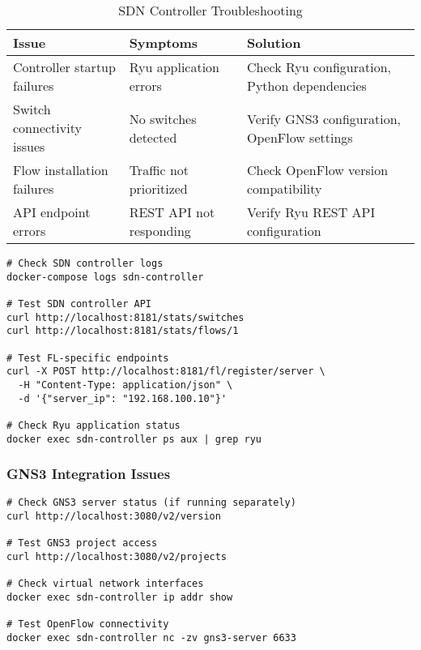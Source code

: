 \begin{table}[H]
\centering
\caption{SDN Controller Troubleshooting}
\label{tab:sdn-issues}
\begin{tabularx}{\textwidth}{@{}lXX@{}}
\toprule
\textbf{Issue} & \textbf{Symptoms} & \textbf{Solution} \\
\midrule
Controller startup failures & Ryu application errors & Check Ryu configuration, Python dependencies \\
Switch connectivity issues & No switches detected & Verify GNS3 configuration, OpenFlow settings \\
Flow installation failures & Traffic not prioritized & Check OpenFlow version compatibility \\
API endpoint errors & REST API not responding & Verify Ryu REST API configuration \\
\bottomrule
\end{tabularx}
\end{table}

\begin{lstlisting}[style=bashcode, caption=SDN Controller Diagnostics]
# Check SDN controller logs
docker-compose logs sdn-controller

# Test SDN controller API
curl http://localhost:8181/stats/switches
curl http://localhost:8181/stats/flows/1

# Test FL-specific endpoints
curl -X POST http://localhost:8181/fl/register/server \
  -H "Content-Type: application/json" \
  -d '{"server_ip": "192.168.100.10"}'

# Check Ryu application status
docker exec sdn-controller ps aux | grep ryu
\end{lstlisting}

\subsubsection{GNS3 Integration Issues}

\begin{lstlisting}[style=bashcode, caption=GNS3 Troubleshooting]
# Check GNS3 server status (if running separately)
curl http://localhost:3080/v2/version

# Test GNS3 project access
curl http://localhost:3080/v2/projects

# Check virtual network interfaces
docker exec sdn-controller ip addr show

# Test OpenFlow connectivity
docker exec sdn-controller nc -zv gns3-server 6633
\end{lstlisting}

